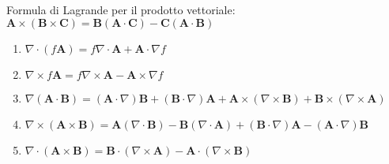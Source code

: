 Formula di Lagrande per il prodotto vettoriale: $\mathbf{A} \times(\mathbf{B} \times \mathbf{C})=\mathbf{B}(\mathbf{A} \cdot \mathbf{C})-\mathbf{C}(\mathbf{A} \cdot \mathbf{B})$
\begin{enumerate}
	\item $\nabla \cdot(f \mathbf{A})=f \nabla \cdot \mathbf{A}+\mathbf{A} \cdot \nabla f$
	\item $\nabla \times f \mathbf{A}=f \nabla \times \mathbf{A}-\mathbf{A} \times \nabla f$
	\item $\nabla(\mathbf{A} \cdot \mathbf{B})=(\mathbf{A} \cdot \nabla) \mathbf{B}+(\mathbf{B} \cdot \nabla) \mathbf{A}+\mathbf{A} \times(\nabla \times \mathbf{B})+\mathbf{B} \times(\nabla \times \mathbf{A})$
	\item $\nabla \times(\mathbf{A} \times \mathbf{B})=\mathbf{A}(\nabla \cdot \mathbf{B})-\mathbf{B}(\nabla \cdot \mathbf{A})+(\mathbf{B} \cdot \nabla) \mathbf{A}-(\mathbf{A} \cdot \nabla) \mathbf{B}$
	\item $\nabla \cdot(\mathbf{A} \times \mathbf{B})=\mathbf{B} \cdot(\nabla \times \mathbf{A})-\mathbf{A} \cdot(\nabla \times \mathbf{B})$
\end{enumerate}